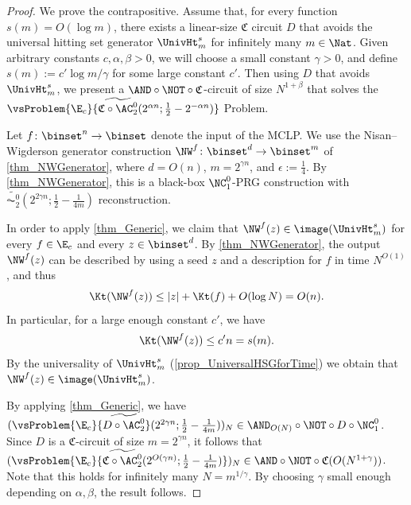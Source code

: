 \documentclass[11pt]{article}
\numberwithin{equation}{section}
\theoremstyle{definition}
\theoremstyle{plain}
\begin{document}
\begin{proof}
  We prove the contrapositive.
  Assume that,
  for every function $s(m) = O(\log m)$,
  there exists a linear-size $\mathfrak{C}$ circuit $D$ that avoids the universal hitting set generator $\UnivHt_m^s$
  for infinitely many $m \in \Nat$.
  Given arbitrary constants $c, \alpha, \beta > 0$,
  we will choose a small constant $\gamma > 0$,
  and define $s(m) := c' \log m / \gamma$ for some large constant $c'$.
  Then using $D$ that avoids $\UnivHt_m^s$,
  we present a $\AND \circ \NOT \circ \mathfrak{C}$-circuit of size $N^{1 + \beta}$ that solves the
  $\vsProblem{\E_c}{\widetilde{\mathfrak{C} \circ \AC^0_2} (2^{\alpha n} ; \frac{1}{2} - 2^{- \alpha n})}$ Problem.

  Let $f \colon \binset^n \to \binset$ denote the input of the MCLP.
  We use the Nisan--Wigderson generator construction $\NW^{f} \colon \binset^{d} \to \binset^{m}$ of \cref{thm_NWGenerator},
  where $d = O(n)$, $m = 2^{\gamma n}$, and $\epsilon := \frac{1}{4}$.
  By \cref{thm_NWGenerator}, this is a black-box $\NC^0_1$-PRG construction with $\widetilde{\AC^0_2}(2^{2 \gamma n}; \frac{1}{2} - \frac{1}{4 m})$ reconstruction.

  In order to apply \cref{thm_Generic},
  we claim that $\NW^f(z) \in \image(\UnivHt_m^s)$
  for every $f \in \E_c$ and every $z \in \binset^d$.
  By \cref{thm_NWGenerator},
  the output $\NW^f(z)$ can be described by
  using a seed $z$ and a description for $f$ in time $N^{O(1)}$,
  and thus
  \begin{align*}
    \Kt(\NW^{f}(z)) \le |z| + \Kt(f) + O(\log N) = O(n).
  \end{align*}
  In particular, for a large enough constant $c'$, we have
  \begin{align*}
    \Kt(\NW^{f}(z)) \le c' n = s(m).
  \end{align*}
  By the universality of $\UnivHt_m^s$ (\cref{prop_UniversalHSGforTime})
  we obtain that $\NW^f(z) \in \image(\UnivHt_m^s)$.

  By applying \cref{thm_Generic},
  we have $(\vsProblem{\E_c}{\widetilde{D \circ \AC^0_2}}(2^{2 \gamma n}; \frac{1}{2} - \frac{1}{4 m}))_N \in \AND_{O(N)} \circ \NOT \circ D \circ \NC^0_1$.
  Since $D$ is a $\mathfrak{C}$-circuit of size $m = 2^{\gamma n}$,
  it follows that
  $(\vsProblem{\E_c}{\widetilde{\mathfrak{C} \circ \AC^0_2}(2^{O(\gamma n)}; \frac{1}{2} - \frac{1}{4 m})})_N \in \AND \circ \NOT \circ \mathfrak{C} (O(N^{1 + \gamma}))$.
  Note that this holds for infinitely many $N = m^{1 / \gamma}$.
  By choosing $\gamma$ small enough depending on $\alpha, \beta$, the result follows.
\end{proof}
\end{document}
